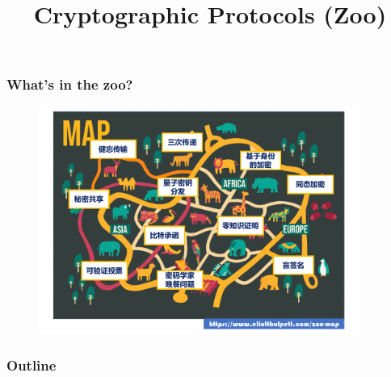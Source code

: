 

\title{Cryptographic Protocols (Zoo)}


\maketitle
\begin{frame}\frametitle{What's in the zoo?}
\begin{figure}
\begin{center}
%
\includegraphics[width=105mm]{pic/zoo-cn.pdf} 
\end{center}
\end{figure}
\end{frame}
\begin{frame}
\frametitle{Outline}
\tableofcontents
\end{frame}
